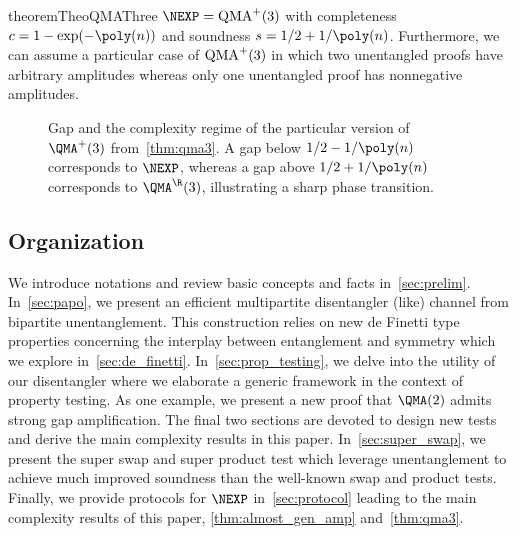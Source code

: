 \begin{restatable}{theorem}{TheoQMAThree}\label{thm:qma3}
  $\NEXP = \textup{QMA}^+(3)$ with completeness $c=1-\exp(-\poly(n))$
  and soundness $s=1/2+1/\poly(n)$. Furthermore, we can assume a
  particular case of $\textup{QMA}^+(3)$ in which two unentangled
  proofs have arbitrary amplitudes whereas only one unentangled proof has
  nonnegative amplitudes.
\end{restatable}

\begin{figure}[ht]
  \captionsetup{width=.8\linewidth}
  \centering
{}
\caption{Gap and the complexity regime of the particular version of $\QMA^+(3)$ from~\cref{thm:qma3}.
         A gap below $1/2-1/\poly(n)$ corresponds to $\NEXP$, whereas a gap above $1/2+1/\poly(n)$
         corresponds to $\QMA^\R(3)$, illustrating a sharp phase transition.}
\end{figure}


\subsection{Organization}

We introduce notations and review basic concepts and facts in~\cref{sec:prelim}.
%
In~\cref{sec:papo}, we present an efficient multipartite disentangler (like) channel from bipartite unentanglement.
%
This construction relies on new de Finetti type properties concerning the interplay between entanglement and symmetry
which we explore in~\cref{sec:de_finetti}.
%
In~\cref{sec:prop_testing}, we delve into the utility of our disentangler where we elaborate a generic framework in the context of property testing. As one example, we present a new proof that $\QMA(2)$ admits strong gap amplification.
%
The final two sections are devoted to design new tests and derive the main complexity results in this paper.
In~\cref{sec:super_swap}, we present the super swap and super product test which leverage
unentanglement to achieve much improved soundness than the well-known swap and product tests.
%
Finally, we provide protocols for $\NEXP$ in~\cref{sec:protocol} leading to the main complexity results of this paper,
\cref{thm:almost_gen_amp} and~\cref{thm:qma3}.
